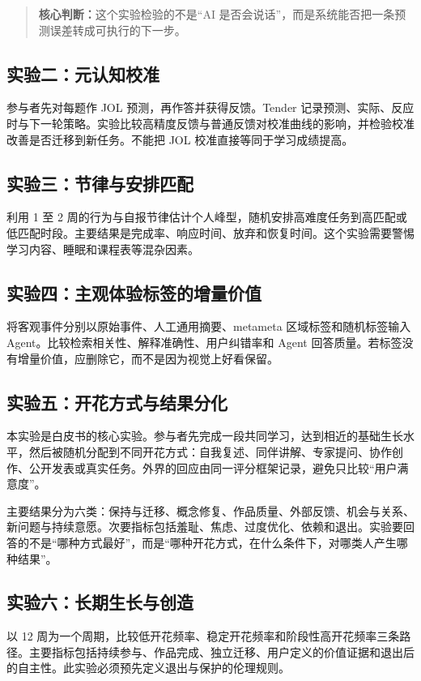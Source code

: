 \documentclass[UTF8,a4paper,11pt]{ctexart}
\newcommand{\keypoint}[1]{\begin{quote}\noindent\textbf{\color{TenderBlue}核心判断：}#1\end{quote}}
\begin{document}
\keypoint{这个实验检验的不是“AI 是否会说话”，而是系统能否把一条预测误差转成可执行的下一步。}

\subsection{实验二：元认知校准}

参与者先对每题作 JOL 预测，再作答并获得反馈。Tender 记录预测、实际、反应时与下一轮策略。实验比较高精度反馈与普通反馈对校准曲线的影响，并检验校准改善是否迁移到新任务。不能把 JOL 校准直接等同于学习成绩提高。

\subsection{实验三：节律与安排匹配}

利用 1 至 2 周的行为与自报节律估计个人峰型，随机安排高难度任务到高匹配或低匹配时段。主要结果是完成率、响应时间、放弃和恢复时间。这个实验需要警惕学习内容、睡眠和课程表等混杂因素。

\subsection{实验四：主观体验标签的增量价值}

将客观事件分别以原始事件、人工通用摘要、metameta 区域标签和随机标签输入 Agent。比较检索相关性、解释准确性、用户纠错率和 Agent 回答质量。若标签没有增量价值，应删除它，而不是因为视觉上好看保留。

\subsection{实验五：开花方式与结果分化}

本实验是白皮书的核心实验。参与者先完成一段共同学习，达到相近的基础生长水平，然后被随机分配到不同开花方式：自我复述、同伴讲解、专家提问、协作创作、公开发表或真实任务。外界的回应由同一评分框架记录，避免只比较“用户满意度”。

主要结果分为六类：保持与迁移、概念修复、作品质量、外部反馈、机会与关系、新问题与持续意愿。次要指标包括羞耻、焦虑、过度优化、依赖和退出。实验要回答的不是“哪种方式最好”，而是“哪种开花方式，在什么条件下，对哪类人产生哪种结果”。

\subsection{实验六：长期生长与创造}

以 12 周为一个周期，比较低开花频率、稳定开花频率和阶段性高开花频率三条路径。主要指标包括持续参与、作品完成、独立迁移、用户定义的价值证据和退出后的自主性。此实验必须预先定义退出与保护的伦理规则。
\end{document}
